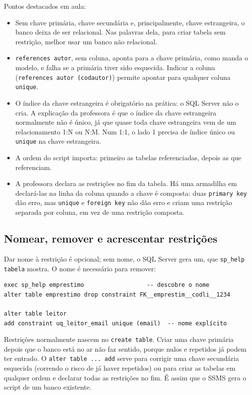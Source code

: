 Pontos destacados em aula:

\begin{itemize}
	\item Sem chave primária, chave secundária e, principalmente, chave
	estrangeira, o banco deixa de ser relacional. Nas palavras dela, para
	criar tabela sem restrição, melhor usar um banco não relacional.
	\item \texttt{references autor}, sem coluna, aponta para a chave
	primária, como manda o modelo, e falha se a primária tiver sido
	esquecida. Indicar a coluna (\texttt{references autor (codautor)})
	permite apontar para qualquer coluna \texttt{unique}.
	\item O índice da chave estrangeira é obrigatório na prática: o SQL
	Server não o cria. A explicação da professora é que o índice da
	chave estrangeira normalmente não é único, já que quase toda chave
	estrangeira vem de um relacionamento 1:N ou N:M. Num 1:1, o lado 1
	precisa de índice único ou \texttt{unique} na chave estrangeira.
	\item A ordem do script importa: primeiro as tabelas referenciadas,
	depois as que referenciam.
	\item A professora declara as restrições no fim da tabela. Há uma
	armadilha em declará-las na linha da coluna quando a chave é composta:
	duas \texttt{primary key} dão erro, mas \texttt{unique} e
	\texttt{foreign key} não dão erro e criam uma restrição separada por
	coluna, em vez de uma restrição composta.
\end{itemize}

\subsection{Nomear, remover e acrescentar restrições}

Dar nome à restrição é opcional; sem nome, o SQL Server gera um, que
\texttt{sp\_help tabela} mostra. O nome é necessário para remover:

\begin{lstlisting}
exec sp_help emprestimo                  -- descobre o nome
alter table emprestimo drop constraint FK__emprestim__codli__1234

alter table leitor
add constraint uq_leitor_email unique (email)  -- nome explícito
\end{lstlisting}

Restrições normalmente nascem no \texttt{create table}. Criar uma
chave primária depois que o banco está no ar não faz sentido, porque
nulos e repetidos já podem ter entrado. O \texttt{alter table ... add}
serve para corrigir uma chave secundária esquecida (correndo o risco de
já haver repetidos) ou para criar as tabelas em qualquer ordem e
declarar todas as restrições no fim. É assim que o SSMS gera o script de
um banco existente.

